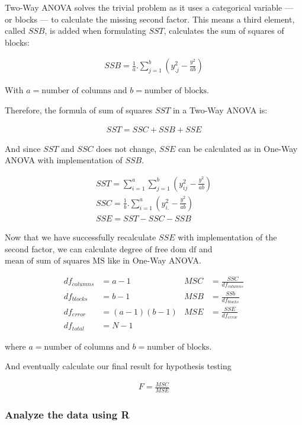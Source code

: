 \documentclass[a4paper]{article}
\numberwithin{equation}{section}
\begin{document}
Two-Way ANOVA solves the trivial problem as it uses a categorical variable --- or blocks --- to calculate the missing second factor. This means a third element, called \(SSB\), is added when formulating \(SST\),  calculates the sum of squares of blocks:

\begin{align*}
  SSB = \frac{1}{a}.\sum_{j=1}^{b}(y^2_{.j} - \frac{y^2_{..}}{ab})
\end{align*}

With \(a = \text{number of columns}\) and \(b = \text{number of blocks}\).

Therefore, the formula of sum of squares \(SST\) in a Two-Way ANOVA is:

\begin{align*}
  SST = SSC + SSB + SSE
\end{align*}

And since \(SST\) and \(SSC\) does not change, \(SSE\) can be calculated as in One-Way ANOVA with implementation of \(SSB\).

\begin{align*}
  SST = \sum_{i=1}^{a}\sum_{j=1}^{b}(y^2_{ij} - \frac{y^2_{..}}{ab}) \\
  SSC = \frac{1}{b}.\sum_{i=1}^{a}(y^2_{i.} - \frac{y^2_{..}}{ab})   \\
  SSE = SST - SSC - SSB
\end{align*}

Now that we have successfully recalculate \(SSE\) with implementation of the second factor, we can calculate \(\text{degree of free dom df}\) and \(\text{mean of sum of  squares MS}\) like in One-Way ANOVA.\

\begin{align*}
  df_{columns} & = a - 1      & MSC & = \frac{SSC}{df_{columns}} \\
  df_{blocks}  & = b - 1      & MSB & = \frac{SSb}{df_{blocks}}  \\
  df_{error}   & = (a-1)(b-1) & MSE & = \frac{SSE}{df_{error}}   \\
  df_{total}   & = N-1
\end{align*}

where  \(a = \text{number of columns}\) and \(b = \text{number of blocks}\).

And eventually calculate our final result for hypothesis testing

\begin{align*}
  F = \frac{MSC}{MSE}
\end{align*}
\subsubsection{Analyze the data using R}
\end{document}

